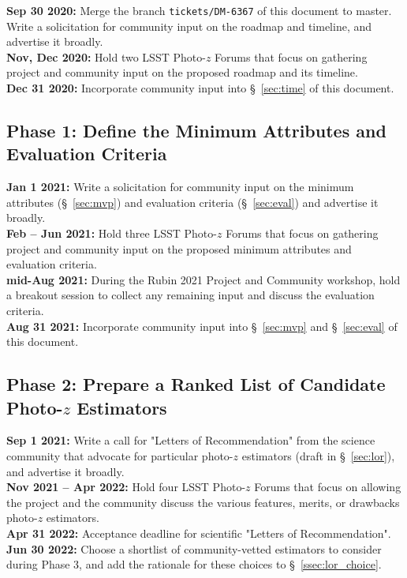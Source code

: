 \documentclass[DM,lsstdraft,toc]{lsstdoc}
\begin{document}
{\bf Sep 30 2020:} Merge the branch {\tt tickets/DM-6367} of this document to master. Write a solicitation for community input on the roadmap and timeline, and advertise it broadly. \\
{\bf Nov, Dec 2020:} Hold two LSST Photo-$z$ Forums that focus on gathering project and community input on the proposed roadmap and its timeline. \\
{\bf Dec 31 2020:} Incorporate community input into \S~\ref{sec:time} of this document.

\subsection{Phase 1: Define the Minimum Attributes and Evaluation Criteria}\label{ssec:time_mvp}

{\bf Jan 1 2021:} Write a solicitation for community input on the minimum attributes (\S~\ref{sec:mvp}) and evaluation criteria (\S~\ref{sec:eval}) and advertise it broadly. \\
{\bf Feb -- Jun 2021:} Hold three LSST Photo-$z$ Forums that focus on gathering project and community input on the proposed minimum attributes and evaluation criteria. \\
{\bf mid-Aug 2021:} During the Rubin 2021 Project and Community workshop, hold a breakout session to collect any remaining input and discuss the evaluation criteria. \\
{\bf Aug 31 2021:} Incorporate community input into \S~\ref{sec:mvp} and \S~\ref{sec:eval} of this document.

\subsection{Phase 2: Prepare a Ranked List of Candidate Photo-$z$ Estimators}\label{ssec:time_wp}

{\bf Sep 1 2021:} Write a call for "Letters of Recommendation" from the science community that advocate for particular photo-$z$ estimators (draft in \S~\ref{sec:lor}), and advertise it broadly. \\
{\bf Nov 2021 -- Apr 2022:} Hold four LSST Photo-$z$ Forums that focus on allowing the project and the community discuss the various features, merits, or drawbacks photo-$z$ estimators. \\
{\bf Apr 31 2022:} Acceptance deadline for scientific "Letters of Recommendation".\\
{\bf Jun 30 2022:} Choose a shortlist of community-vetted estimators to consider during Phase 3, and add the rationale for these choices to \S~\ref{ssec:lor_choice}.
\end{document}
